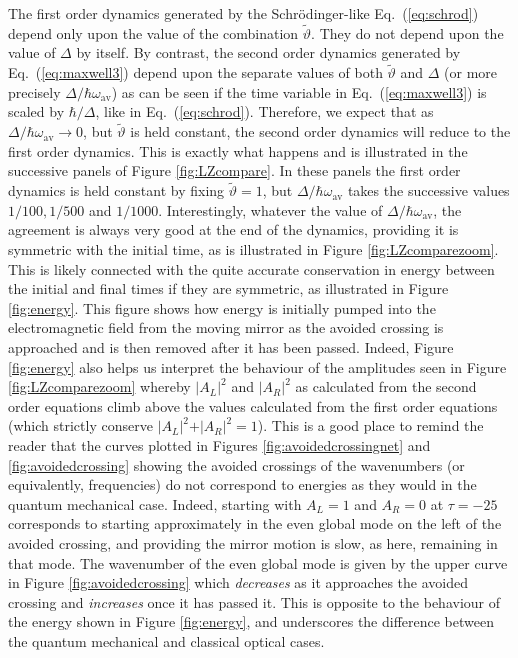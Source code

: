 \documentclass[twocolumn,english,pra,aps,superscriptaddress,floatfix]{revtex4-1}
\begin{document}
The first order dynamics generated by the Schr\"{o}dinger-like Eq.\ (\ref{eq:schrod}) depend only upon the value of the combination $\tilde{\vartheta}$. They do not depend upon the value of $\Delta$ by itself. By contrast, the second order dynamics generated by Eq.\ (\ref{eq:maxwell3}) depend upon the separate values of both $\tilde{\vartheta}$ and $\Delta$
(or more precisely $\Delta/\hbar \omega_{\mathrm{av}}$) as can be seen if the time variable in Eq.\ (\ref{eq:maxwell3}) is scaled by $\hbar / \Delta$, like in Eq.\ (\ref{eq:schrod}). Therefore, we expect that as $\Delta/\hbar \omega_{\mathrm{av}}\rightarrow 0$, but $\tilde{\vartheta}$ is held constant, the second order dynamics will reduce to the first order dynamics. This is exactly what happens and is illustrated in the successive panels of Figure \ref{fig:LZcompare}. In  these panels the first order dynamics is held constant by fixing $\tilde{\vartheta}=1$, but $\Delta/\hbar \omega_{\mathrm{av}}$ takes the successive values $1/100,1/500$ and $1/1000$. Interestingly, whatever the value of $\Delta/\hbar \omega_{\mathrm{av}}$, the agreement is always very good at the end of the dynamics, providing it is symmetric with the initial time, as is illustrated in Figure \ref{fig:LZcomparezoom}. This is likely connected with the quite accurate conservation in energy between the initial and final times if they are symmetric, as illustrated in Figure \ref{fig:energy}. This figure shows how energy is initially pumped into the electromagnetic field from the moving mirror as the avoided crossing is approached and is then removed after it has been passed. Indeed, Figure \ref{fig:energy} also helps us interpret the behaviour of the amplitudes seen in Figure \ref{fig:LZcomparezoom} whereby $\vert A_{L}\vert^2$ and $\vert A_{R}\vert^2$ as calculated from the second order equations climb above the values calculated from the first order equations (which strictly conserve $\vert A_{L}\vert^2+\vert A_{R}\vert^2=1$). This is a good place to remind the reader that the curves plotted in Figures \ref{fig:avoidedcrossingnet} and \ref{fig:avoidedcrossing} showing the avoided crossings of the wavenumbers (or equivalently, frequencies) do not correspond to energies as they would in the quantum mechanical case. Indeed, starting with $A_{L}=1$ and $A_{R}=0$ at $\tau=-25$ corresponds to starting approximately in the even global mode on the left of the avoided crossing, and providing the mirror motion is slow, as here, remaining in that mode. The wavenumber of the even global mode is given by the upper curve in Figure \ref{fig:avoidedcrossing} which \emph{decreases} as it approaches the avoided crossing and \emph{increases} once it has passed it. This is opposite to the behaviour of the energy shown in Figure \ref{fig:energy}, and underscores the difference between the quantum mechanical and classical optical cases.
\end{document}

